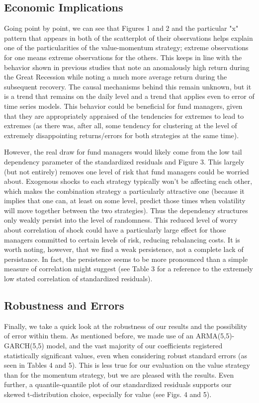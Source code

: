 \documentclass[11pt,letterpaper]{memoir}
\begin{document}
\subsection*{Economic Implications}
Going point by point, we can see that Figures 1 and 2 and the particular "x" pattern that appears in both of the scatterplot of their observations helps explain one of the particularities of the value-momentum strategy; extreme observations for one means extreme observations for the others. This keeps in line with the behavior shown in previous studies that note an anomalously high return during the Great Recession while noting a much more average return during the subsequent recovery. The causal mechanisms behind this remain unknown, but it is a trend that remains on the daily level and a trend that applies even to error of time series models. This behavior could be beneficial for fund managers, given that they are appropriately appraised of the tendencies for extremes to lead to extremes (as there was, after all, some tendency for clustering at the level of extremely disappointing returns/errors for both strategies at the same time).

However, the real draw for fund managers would likely come from the low tail dependency parameter of the standardized residuals and Figure 3. This largely (but not entirely) removes one level of risk that fund managers could be worried about. Exogenous shocks to each strategy typically won't be affecting each other, which makes the combination strategy a particularly attractive one (because it implies that one can, at least on some level, predict those times when volatility will move together between the two strategies). Thus the dependency structures only weakly persist into the level of randomness. This reduced level of worry about correlation of shock could have a particularly large effect for those managers committed to certain levels of risk, reducing rebalancing costs. It is worth noting, however, that we find a weak persistence, not a complete lack of persistance. In fact, the persistence seems to be more pronounced than a simple measure of correlation might suggest (see Table 3 for a reference to the extremely low stated correlation of standardized residuals).

\subsection*{Robustness and Errors}
Finally, we take a quick look at the robustness of our results and the possibility of error within them. As mentioned before, we made use of an ARMA(5,5)-GARCH(5,5) model, and the vast majority of our coefficients registered statistically significant values, even when considering robust standard errors (as seen in Tables 4 and 5). This is less true for our evaluation on the value strategy than for the momentum strategy, but we are pleased with the results. Even further, a quantile-quantile plot of our standardized residuals supports our skewed t-distribution choice, especially for value (see Figs. 4 and 5). 
\end{document}
